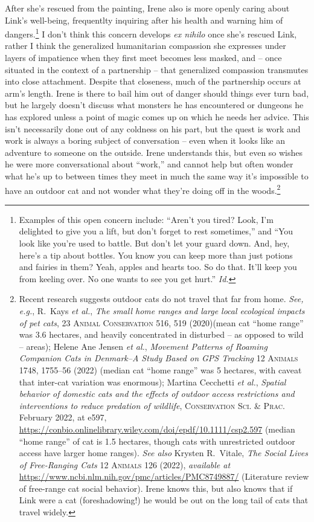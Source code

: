   After she's rescued from the painting, Irene also is more openly caring about Link's well-being, frequentlty inquiring after his health and warning him of dangers.\footnote{Examples of this open concern include: ``Aren’t you tired? Look, I’m delighted to give you a lift, but don’t forget to rest sometimes,'' and ``You look like you’re used to battle. But don’t let your guard down. And, hey, here’s a tip about bottles. You know you can keep more than just potions and fairies in them? Yeah, apples and hearts too. So do that. It’ll keep you from keeling over. No one wants to see you get hurt.'' \textit{Id.}} I don't think this concern develops \emph{ex nihilo} once she's rescued Link, rather I think the generalized humanitarian compassion she expresses under layers of impatience when they first meet becomes less masked, and -- once situated in the context of a partnership -- that generalized compassion transmutes into close attachment. Despite that closeness, much of the partnership occurs at arm's length. Irene is there to bail him out of danger should things ever turn bad, but he largely doesn't discuss what monsters he has encountered or dungeons he has explored unless a point of magic comes up on which he needs her advice. This isn't necessarily done out of any coldness on his part, but the quest is work and work is always a boring subject of conversation -- even when it looks like an adventure to someone on the outside. Irene understands this, but even so wishes he were more conversational about ``work,'' and cannot help but often wonder what he's up to between times they meet in much the same way it's impossible to have an outdoor cat and not wonder what they're doing off in the woods.\footnote{Recent research suggests outdoor cats do not travel that far from home. \textit{See, e.g.}, R.~Kays \textit{et al.}, \textit{The small home ranges and large local ecological impacts of pet cats}, 23 \textsc{Animal Conservation} 516, 519 (2020)(mean cat ``home range'' was 3.6 hectares, and heavily concentrated in disturbed -- as opposed to wild -- areas); Helene Ane Jensen \textit{et al.}, \textit{Movement Patterns of Roaming Companion Cats in Denmark--A Study Based on GPS Tracking} 12 \textsc{Animals} 1748, 1755--56 (2022) (median cat ``home range'' was 5 hectares, with caveat that inter-cat variation was enormous); Martina Cecchetti \textit{et al.}, \textit{Spatial behavior of domestic cats and the effects of outdoor access restrictions and interventions to reduce predation of wildlife}, \textsc{Conservation Sci. \& Prac.} February 2022, at e597, \url{https://conbio.onlinelibrary.wiley.com/doi/epdf/10.1111/csp2.597} (median ``home range'' of cat is 1.5 hectares, though cats with unrestricted outdoor access have larger home ranges). \textit{See also} Krysten R.~Vitale, \textit{The Social Lives of Free-Ranging Cats} 12 \textsc{Animals} 126 (2022), \textit{available at} \url{https://www.ncbi.nlm.nih.gov/pmc/articles/PMC8749887/} (Literature review of free-range cat social behavior). Irene knows this, but also knows that if Link were a cat (foreshadowing!) he would be out on the long tail of cats that travel widely.}  

